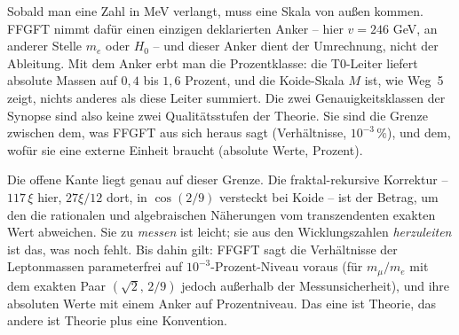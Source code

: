 Sobald man eine Zahl in MeV verlangt, muss eine Skala von außen kommen. FFGFT
nimmt dafür einen einzigen deklarierten Anker -- hier $v = 246$ GeV, an anderer
Stelle $m_e$ oder $H_0$ -- und dieser Anker dient der Umrechnung, nicht der
Ableitung. Mit dem Anker erbt man die Prozentklasse: die T0-Leiter liefert
absolute Massen auf $0{,}4$ bis $1{,}6$ Prozent, und die Koide-Skala $M$ ist,
wie Weg~5 zeigt, nichts anderes als diese Leiter summiert. Die zwei
Genauigkeitsklassen der Synopse sind also keine zwei Qualitätsstufen der
Theorie. Sie sind die Grenze zwischen dem, was FFGFT aus sich heraus sagt
(Verhältnisse, $10^{-3}\,\%$), und dem, wofür sie eine externe Einheit
braucht (absolute Werte, Prozent).

Die offene Kante liegt genau auf dieser Grenze. Die fraktal-rekursive
Korrektur -- $117\,\xi$ hier, $27\xi/12$ dort, in $\cos(2/9)$ versteckt bei
Koide -- ist der Betrag, um den die rationalen und algebraischen Näherungen
vom transzendenten exakten Wert abweichen. Sie zu \emph{messen} ist leicht; sie
aus den Wicklungszahlen \emph{herzuleiten} ist das, was noch fehlt. Bis dahin
gilt: FFGFT sagt die Verhältnisse der Leptonmassen parameterfrei auf
$10^{-3}$-Prozent-Niveau voraus (für $m_\mu/m_e$ mit dem exakten Paar
$(\sqrt2,\,2/9)$ jedoch außerhalb der Messunsicherheit), und ihre absoluten Werte mit einem Anker auf
Prozentniveau. Das eine ist Theorie, das andere ist Theorie plus eine
Konvention.
